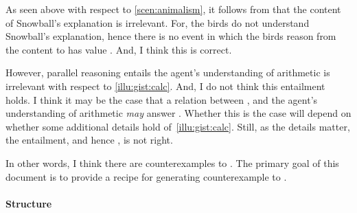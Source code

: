 \begin{note}
  As seen above with respect to \autoref{scen:animalism}, it follows from \issueInclusion{} that the content of Snowball's explanation is irrelevant.
  For, the birds do not understand Snowball's explanation, hence there is no event in which the birds reason from the content to  has value .
  And, I think this is correct.

  However, parallel reasoning entails the agent's understanding of arithmetic is irrelevant with respect to \autoref{illu:gist:calc}.
  And, I do not think this entailment holds.
  I think it may be the case that a relation between \propM{\gistCalcEq{}},  and the agent's understanding of arithmetic \emph{may} answer \qWhy{}.
  Whether this is the case will depend on whether some additional details hold of~\autoref{illu:gist:calc}.
  Still, as the details matter, the entailment, and hence \issueInclusion{}, is not right.
\end{note}

\begin{note}
  In other words, I think there are counterexamples to \issueInclusion{}.
  The primary goal of this document is to provide a recipe for generating counterexample to \issueInclusion{}.
\end{note}

\paragraph*{Structure}


